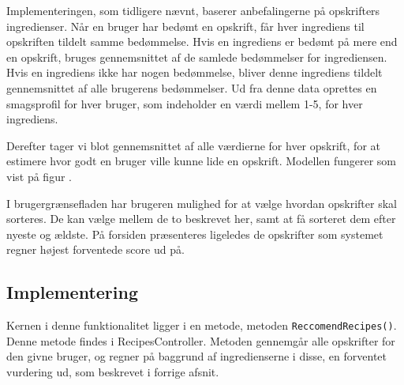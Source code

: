 Implementeringen, som tidligere nævnt, baserer anbefalingerne på opskrifters ingredienser.
Når en bruger har bedømt en opskrift, får hver ingrediens til opskriften tildelt samme bedømmelse.
Hvis en ingrediens er bedømt på mere end en opskrift, bruges gennemsnittet af de samlede bedømmelser for ingrediensen.
Hvis en ingrediens ikke har nogen bedømmelse, bliver denne ingrediens tildelt gennemsnittet af alle brugerens bedømmelser.
Ud fra denne data oprettes en smagsprofil for hver bruger, som indeholder en værdi mellem 1-5, for hver ingrediens.

Derefter tager vi blot gennemsnittet af alle værdierne for hver opskrift, for at estimere hvor godt en bruger ville kunne lide en opskrift.
Modellen fungerer som vist på figur .


I brugergrænsefladen har brugeren mulighed for at vælge hvordan opskrifter skal sorteres.
De kan vælge mellem de to beskrevet her, samt at få sorteret dem efter nyeste og ældste.
På forsiden præsenteres ligeledes de opskrifter som systemet regner højest forventede score ud på.

\subsection{Implementering}
Kernen i denne funktionalitet ligger i en metode, metoden \texttt{ReccomendRecipes()}.
Denne metode findes i RecipesController.
Metoden gennemgår alle opskrifter for den givne bruger, og regner på baggrund af ingredienserne i disse, en forventet vurdering ud, som beskrevet i forrige afsnit.

